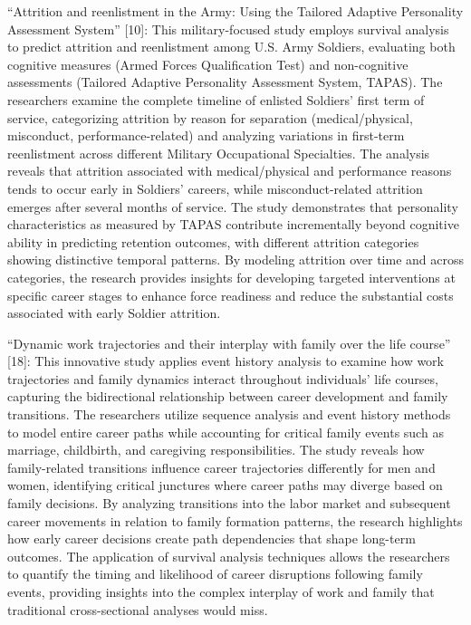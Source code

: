 \documentclass[
  letterpaper,
  DIV=11,
  numbers=noendperiod]{scrartcl}
\begin{document}
``Attrition and reenlistment in the Army: Using the Tailored Adaptive
Personality Assessment System'' {[}10{]}: This military-focused study
employs survival analysis to predict attrition and reenlistment among
U.S. Army Soldiers, evaluating both cognitive measures (Armed Forces
Qualification Test) and non-cognitive assessments (Tailored Adaptive
Personality Assessment System, TAPAS). The researchers examine the
complete timeline of enlisted Soldiers' first term of service,
categorizing attrition by reason for separation (medical/physical,
misconduct, performance-related) and analyzing variations in first-term
reenlistment across different Military Occupational Specialties. The
analysis reveals that attrition associated with medical/physical and
performance reasons tends to occur early in Soldiers' careers, while
misconduct-related attrition emerges after several months of service.
The study demonstrates that personality characteristics as measured by
TAPAS contribute incrementally beyond cognitive ability in predicting
retention outcomes, with different attrition categories showing
distinctive temporal patterns. By modeling attrition over time and
across categories, the research provides insights for developing
targeted interventions at specific career stages to enhance force
readiness and reduce the substantial costs associated with early Soldier
attrition.

``Dynamic work trajectories and their interplay with family over the
life course'' {[}18{]}: This innovative study applies event history
analysis to examine how work trajectories and family dynamics interact
throughout individuals' life courses, capturing the bidirectional
relationship between career development and family transitions. The
researchers utilize sequence analysis and event history methods to model
entire career paths while accounting for critical family events such as
marriage, childbirth, and caregiving responsibilities. The study reveals
how family-related transitions influence career trajectories differently
for men and women, identifying critical junctures where career paths may
diverge based on family decisions. By analyzing transitions into the
labor market and subsequent career movements in relation to family
formation patterns, the research highlights how early career decisions
create path dependencies that shape long-term outcomes. The application
of survival analysis techniques allows the researchers to quantify the
timing and likelihood of career disruptions following family events,
providing insights into the complex interplay of work and family that
traditional cross-sectional analyses would miss.
\end{document}

